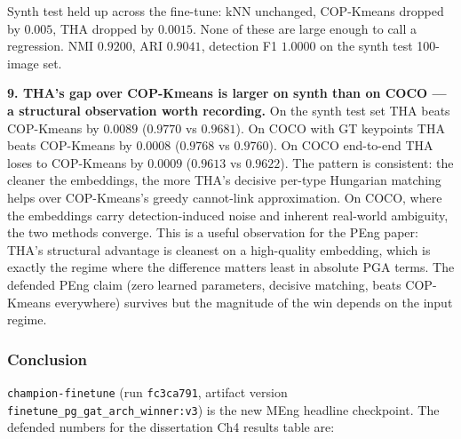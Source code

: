 \vspace{0.5em}

Synth test held up across the fine-tune: kNN unchanged, COP-Kmeans dropped by $0.005$, THA dropped by $0.0015$. None of these are large enough to call a regression. NMI $0.9200$, ARI $0.9041$, detection F1 $1.0000$ on the synth test 100-image set.

\textbf{9. THA's gap over COP-Kmeans is larger on synth than on COCO --- a structural observation worth recording.}
On the synth test set THA beats COP-Kmeans by $0.0089$ ($0.9770$ vs $0.9681$).
On COCO with GT keypoints THA beats COP-Kmeans by $0.0008$ ($0.9768$ vs $0.9760$).
On COCO end-to-end THA loses to COP-Kmeans by $0.0009$ ($0.9613$ vs $0.9622$).
The pattern is consistent: the cleaner the embeddings, the more THA's decisive per-type Hungarian matching helps over COP-Kmeans's greedy cannot-link approximation.
On COCO, where the embeddings carry detection-induced noise and inherent real-world ambiguity, the two methods converge.
This is a useful observation for the PEng paper: THA's structural advantage is cleanest on a high-quality embedding, which is exactly the regime where the difference matters least in absolute PGA terms.
The defended PEng claim (zero learned parameters, decisive matching, beats COP-Kmeans everywhere) survives but the magnitude of the win depends on the input regime.

\subsubsection{Conclusion}

\texttt{champion-finetune} (run \texttt{fc3ca791}, artifact version \texttt{finetune\_pg\_gat\_arch\_winner:v3}) is the new MEng headline checkpoint.
The defended numbers for the dissertation Ch4 results table are:

